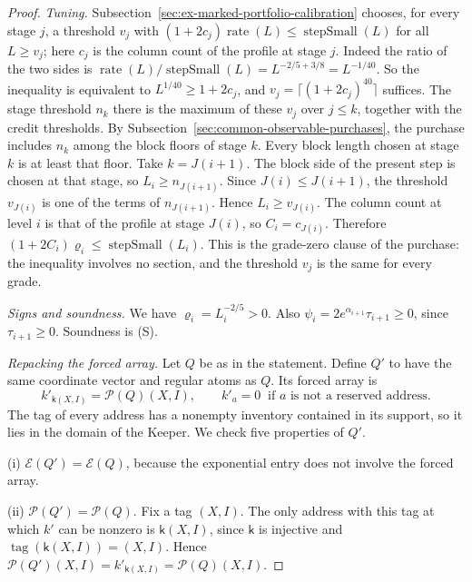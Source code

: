 \begin{proof}
\emph{Tuning.} Subsection~\ref{sec:ex-marked-portfolio-calibration}
chooses, for every stage $j$, a threshold $v_j$ with
$(1+2c_j)\operatorname{rate}(L)\le\operatorname{stepSmall}(L)$ for all
$L\ge v_j$; here $c_j$ is the column count of the profile at stage $j$.
Indeed the ratio of the two sides is
$\operatorname{rate}(L)/\operatorname{stepSmall}(L)=L^{-2/5+3/8}=L^{-1/40}$.
So the inequality is equivalent to $L^{1/40}\ge1+2c_j$, and
$v_j=\lceil(1+2c_j)^{40}\rceil$ suffices. The stage threshold $n_k$
there is the maximum of these $v_j$ over $j\le k$, together with the
credit thresholds. By Subsection~\ref{sec:common-observable-purchases},
the purchase includes $n_k$ among the block floors of stage $k$. Every
block length chosen at stage $k$ is at least that floor. Take
$k=J(i+1)$. The block side of the present step is chosen at that stage,
so $L_i\ge n_{J(i+1)}$. Since $J(i)\le J(i+1)$, the threshold
$v_{J(i)}$ is one of the terms of $n_{J(i+1)}$. Hence
$L_i\ge v_{J(i)}$. The column count at level $i$ is that of the profile
at stage $J(i)$, so $C_i=c_{J(i)}$. Therefore
$(1+2C_i)\varrho_i\le\operatorname{stepSmall}(L_i)$. This is the
grade-zero clause of the purchase: the inequality involves no section,
and the threshold $v_j$ is the same for every grade.

\emph{Signs and soundness.} We have $\varrho_i=L_i^{-2/5}>0$. Also
$\psi_i=2e^{\alpha_{i+1}}\tau_{i+1}\ge0$, since $\tau_{i+1}\ge0$.
Soundness is (S).

\emph{Repacking the forced array.} Let $Q$ be as in the statement. Define
$Q'$ to have the same coordinate vector and regular atoms as $Q$. Its
forced array is
\[
 k'_{\mathsf k(X,I)}=\mathcal P(Q)(X,I),\qquad
 k'_a=0\ \text{ if $a$ is not a reserved address}.
\]
The tag of every address has a nonempty inventory contained in its
support, so it lies in the domain of the Keeper. We check five
properties of $Q'$.

(i) $\mathcal E(Q')=\mathcal E(Q)$, because the exponential entry does
not involve the forced array.

(ii) $\mathcal P(Q')=\mathcal P(Q)$. Fix a tag $(X,I)$. The only address
with this tag at which $k'$ can be nonzero is $\mathsf k(X,I)$, since
$\mathsf k$ is injective and $\operatorname{tag}(\mathsf k(X,I))=(X,I)$.
Hence $\mathcal P(Q')(X,I)=k'_{\mathsf k(X,I)}=\mathcal P(Q)(X,I)$.


\end{proof}
